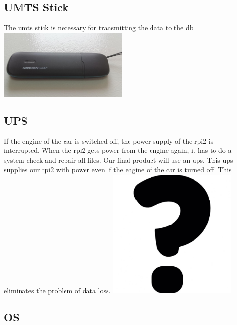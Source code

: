 \subsection{UMTS Stick}
The \gls{umts} stick is necessary for transmitting the data to the \gls{db}.\newline
\includegraphics[width=0.48\textwidth]{bilder/Medion_3}
\subsection{UPS}
If the engine of the car is switched off, the power supply of the \gls{rpi2} is interrupted. When the \gls{rpi2} gets power from the engine again, it has to do a system check and repair all files. Our final product will use an \gls{ups}. This \gls{ups} supplies our \gls{rpi2} with power even if the engine of the car is turned off. This eliminates the problem of data loss.\newline
\includegraphics[width=0.48\textwidth]{bilder/USV}
\newpage
\subsection{OS}
